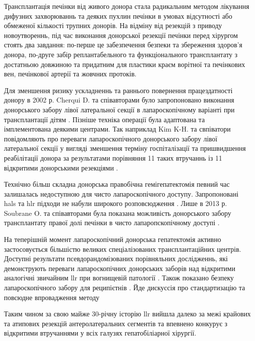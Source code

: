 \begin{refsection}
Трансплантація печінки від живого донора стала радикальним методом лікування дифузних захворюваннь та деяких пухлин печінки в умовах відсутності або обмеженої кількості трупних донорів. На відміну від резекцій з приводу новоутвореннь, під час виконання донорської резекції печінки перед хірургом стоять два завдання: по-перше це забезпечення безпеки та збереження здоров'я донора, по-друге забір реплантабельного та функціонального трансплантату з достатньою довжиною та придатним для пластики краєм ворітної та печінкових вен, печінкової артерії та жовчних протоків. 

Для зменшення ризику ускладненнь та раннього повернення працездатності донору в 2002 р. Cherqui D. та співавторами було запропоновано виконання донорського забору лівої латеральної секції в лапароскопічному варіанті при трансплантації дітям \cite{Cherqui2002a}. Пізніше техніка операції була адаптована та імплементована деякими центрами. Так наприклад Kim K-H. та свпіватори повідомляють про переваги лапароскопічного донорського забору лівої латеральної секції у вигляді зменшення терміну госпіталізації та пришвидшення реабілітації донора за результатами порівняння 11 таких втручаннь із 11 відкритими донорськими резекціями \cite{Kim2011}. 

Технічно більш складна донорська правобічна гемігепатектомія певний час залишалась недоступною для чисто лапароскопічного доступу. Запропоновані \acrshort{hals} та \acrshort{hlr} підходи не набули широкого розповсюдження \cite{Koffron2006, Thenappan2011, Lin2013}. Лише в 2013 р. Soubrane O. та співавторами була показана можливість донорського забору трансплантату правої долі печінки в чисто лапаропскопічному доступі \cite{Soubrane2013}. 

На теперішній момент лапароскопічний донорська гепатектомія активно застосовується більшістю великих спеціалізованих трансплантаційних центрів. Доступні результати псевдорандомізованих порівняльних дослідженнь, які демонструють переваги лапароскопічних донорських заборів над відкритими  аналогічні звичайним \acrshort{llr} при вогнищевій патології \cite{Broering2018, Park2019a}. Також показано безпеку лапароскопічного забору для реципієтнів \cite{Kwon2018a}. Йде дискуссія про стандартизацію та повсюдне впровадження методу \cite{Au2018, Samstein2018}


Таким чином за свою майже 30-річну історію \acrshort{llr} вийшла далеко за межі крайових та атипових резекцій антеролатеральних сегментів та впевнено конкурує з відкритими втручаннями у всіх галузях гепатобіліарної хірургії. 

\printbibliography[heading=subbibliography]

\end{refsection}